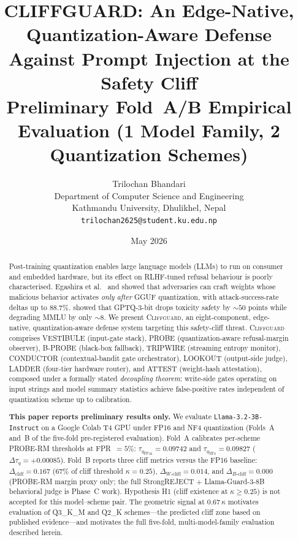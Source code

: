 \documentclass[11pt,a4paper]{article}
\title{%
  \textbf{CLIFFGUARD: An Edge-Native, Quantization-Aware Defense\\
  Against Prompt Injection at the Safety Cliff}\\[0.4em]
  {\large Preliminary Fold~A/B Empirical Evaluation
  (1 Model Family, 2 Quantization Schemes)}
}
\author{
  Trilochan Bhandari\\
  \small Department of Computer Science and Engineering\\
  \small Kathmandu University, Dhulikhel, Nepal\\
  \small \texttt{trilochan2625@student.ku.edu.np}
}
\date{May 2026}
\newcommand{\cliff}{\Delta_{\mathrm{cliff}}}
\newcommand{\wcliff}{\Delta_{W\text{-cliff}}}
\newcommand{\bcliff}{\Delta_{B\text{-cliff}}}
\newcommand{\kap}{\kappa}
\newcommand{\tauq}{\tau_q}
\newcommand{\CG}{\textsc{Cliffguard}}
\begin{document}
\maketitle
\thispagestyle{plain}

\begin{abstract}
Post-training quantization enables large language models (LLMs) to run on
consumer and embedded hardware, but its effect on RLHF-tuned refusal behaviour
is poorly characterised.
Egashira et al.~\citep{egashira2024exploiting} and \citet{mindthegap2025} showed
that adversaries can craft weights whose malicious behavior activates \emph{only
after} GGUF quantization, with attack-success-rate deltas up to $88.7\%$.
\citet{hong2024quant} showed that GPTQ-3-bit drops toxicity safety by ${\sim}50$
points while degrading MMLU by only ${\sim}8$.
We present \CG{}, an eight-component, edge-native, quantization-aware defense
system targeting this safety-cliff threat.
\CG{} comprises VESTIBULE (input-gate stack), PROBE (quantization-aware
refusal-margin observer), B-PROBE (black-box fallback), TRIPWIRE (streaming
entropy monitor), CONDUCTOR (contextual-bandit gate orchestrator), LOOKOUT
(output-side judge), LADDER (four-tier hardware router), and ATTEST
(weight-hash attestation), composed under a formally stated \emph{decoupling
theorem}: write-side gates operating on input strings and model summary
statistics achieve false-positive rates independent of quantization scheme up to
calibration.

\textbf{This paper reports preliminary results only.}
We evaluate \texttt{Llama-3.2-3B-Instruct} on a Google Colab T4 GPU under FP16
and NF4 quantization (Folds~A and~B of the five-fold pre-registered evaluation).
Fold~A calibrates per-scheme PROBE-RM thresholds at FPR~$= 5\%$:
$\tauq_{\mathrm{FP16}} = 0.09742$ and $\tauq_{\mathrm{NF4}} = 0.09827$
($\Delta\tauq = +0.00085$).
Fold~B reports three cliff metrics versus the FP16 baseline:
$\cliff = 0.167$ ($67\%$ of cliff threshold $\kap = 0.25$),
$\wcliff = 0.014$, and $\bcliff = 0.000$ (PROBE-RM margin proxy only; the
full StrongREJECT + Llama-Guard-3-8B behavioral judge is Phase~C work).
Hypothesis H1 (cliff existence at $\kap \ge 0.25$) is not accepted for this
model--scheme pair.
The geometric signal at $0.67\,\kap$ motivates evaluation of Q3\_K\_M and Q2\_K
schemes---the predicted cliff zone based on published evidence---and motivates
the full five-fold, multi-model-family evaluation described herein.
\end{abstract}
\end{document}

